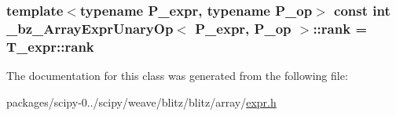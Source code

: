 \subsubsection[{rank}]{\setlength{\rightskip}{0pt plus 5cm}template$<$typename P\+\_\+expr, typename P\+\_\+op$>$ const int {\bf \+\_\+bz\+\_\+\+Array\+Expr\+Unary\+Op}$<$ P\+\_\+expr, P\+\_\+op $>$\+::rank = T\+\_\+expr\+::rank\hspace{0.3cm}{\ttfamily [static]}}\label{class__bz__ArrayExprUnaryOp_aa736afcc97edc921e07290cb8c822555}


The documentation for this class was generated from the following file\+:\begin{DoxyCompactItemize}
\item 
packages/scipy-\/0../scipy/weave/blitz/blitz/array/\hyperlink{expr_8h}{expr.\+h}\end{DoxyCompactItemize}
